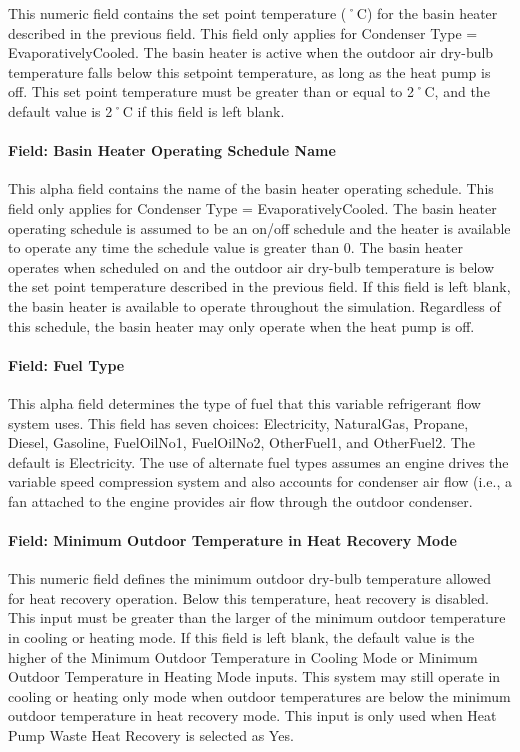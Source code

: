 This numeric field contains the set point temperature (˚C) for the basin heater described in the previous field. This field only applies for Condenser Type = EvaporativelyCooled. The basin heater is active when the outdoor air dry-bulb temperature falls below this setpoint temperature, as long as the heat pump is off. This set point temperature must be greater than or equal to 2˚C, and the default value is 2˚C if this field is left blank.

\paragraph{Field: Basin Heater Operating Schedule Name}\label{field-basin-heater-operating-schedule-name-001}

This alpha field contains the name of the basin heater operating schedule. This field only applies for Condenser Type = EvaporativelyCooled. The basin heater operating schedule is assumed to be an on/off schedule and the heater is available to operate any time the schedule value is greater than 0. The basin heater operates when scheduled on and the outdoor air dry-bulb temperature is below the set point temperature described in the previous field. If this field is left blank, the basin heater is available to operate throughout the simulation. Regardless of this schedule, the basin heater may only operate when the heat pump is off.

\paragraph{Field: Fuel Type}\label{field-fuel-type-001}

This alpha field determines the type of fuel that this variable refrigerant flow system uses. This field has seven choices: Electricity, NaturalGas, Propane, Diesel, Gasoline, FuelOilNo1, FuelOilNo2, OtherFuel1, and OtherFuel2. The default is Electricity. The use of alternate fuel types assumes an engine drives the variable speed compression system and also accounts for condenser air flow (i.e., a fan attached to the engine provides air flow through the outdoor condenser.

\paragraph{Field: Minimum Outdoor Temperature in Heat Recovery Mode}\label{field-minimum-outdoor-temperature-in-heat-recovery-mode}

This numeric field defines the minimum outdoor dry-bulb temperature allowed for heat recovery operation. Below this temperature, heat recovery is disabled. This input must be greater than the larger of the minimum outdoor temperature in cooling or heating mode. If this field is left blank, the default value is the higher of the Minimum Outdoor Temperature in Cooling Mode or Minimum Outdoor Temperature in Heating Mode inputs. This system may still operate in cooling or heating only mode when outdoor temperatures are below the minimum outdoor temperature in heat recovery mode. This input is only used when Heat Pump Waste Heat Recovery is selected as Yes.

